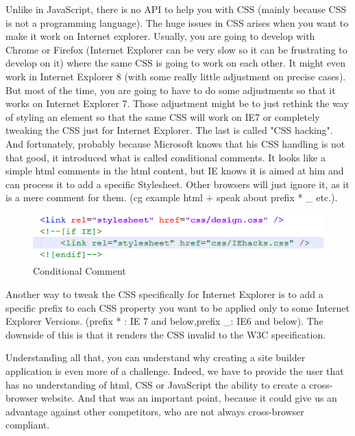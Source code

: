 Unlike in JavaScript, there is no API to help you with CSS (mainly because CSS is not a programming language). The huge issues in CSS arises when you want to make it work on Internet explorer. Usually, you are going to develop with Chrome or Firefox (Internet Explorer can be very slow so it can be frustrating to develop on it) where the same CSS is going to work on each other. It might even work in Internet Explorer 8 (with some really little adjustment on precise cases). But most of the time, you are going to have to do some adjustments so that it works on Internet Explorer 7. Those adjustment might be to just rethink the way of styling an element so that the same CSS will work on IE7 or completely tweaking the CSS just for Internet Explorer.
The last is called "CSS hacking". And fortunately, probably because Microsoft knows that his CSS handling is not that good, it introduced what is called conditional comments. It looks like a simple html comments in the html content, but IE knows it is aimed at him and can process it to add a specific Stylesheet. Other browsers will just ignore it, as it is a mere comment for them. (cg example html + speak about prefix * \_ etc.). 
\begin{figure}[!ht]
\centering
\includegraphics[width=.55\textwidth]{img/comments.png}
\caption{Conditional Comment}
\label{figure:conditional comment}
\end{figure}
Another way to tweak the CSS specifically for Internet Explorer is to add a specific prefix to each CSS property you want to be applied only to some Internet Explorer Versions. (prefix * : IE 7 and below,prefix \_: IE6 and below). The downside of this is that it renders the CSS invalid to the W3C specification.

Understanding all that, you can understand why creating a site builder application is even more of a challenge. Indeed, we have to provide the user that has no understanding of html, CSS or JavaScript the ability to create a cross-browser website. And that was an important point, because it could give us an advantage against other competitors, who are not always cross-browser compliant.



